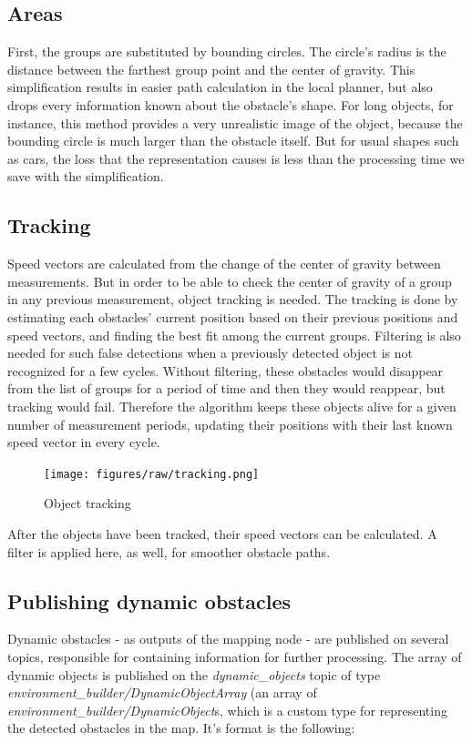 \subsection{Areas}
First, the groups are substituted by bounding circles. The circle's radius is the distance between the farthest group point and the center of gravity. This simplification results in easier path calculation in the local planner, but also drops every information known about the obstacle's shape. For long objects, for instance, this method provides a very unrealistic image of the object, because the bounding circle is much larger than the obstacle itself. But for usual shapes such as cars, the loss that the representation causes is less than the processing time we save with the simplification.

\subsection{Tracking}
\label{chap:tracking}
Speed vectors are calculated from the change of the center of gravity between measurements. But in order to be able to check the center of gravity of a group in any previous measurement, object tracking is needed. The tracking is done by estimating each obstacles' current position based on their previous positions and speed vectors, and finding the best fit among the current groups. Filtering is also needed for such false detections when a previously detected object is not recognized for a few cycles. Without filtering, these obstacles would disappear from the list of groups for a period of time and then they would reappear, but tracking would fail. Therefore the algorithm keeps these objects alive for a given number of measurement periods, updating their positions with their last known speed vector in every cycle.

\begin{figure}[!ht]
    \centering
    \texttt{[image: figures/raw/tracking.png]}
    \caption{Object tracking}
    \label{tracking}
\end{figure}

After the objects have been tracked, their speed vectors can be calculated. A filter is applied here, as well, for smoother obstacle paths.

\subsection{Publishing dynamic obstacles}
\label{chap:publishing_dynamic_obstacles}
Dynamic obstacles - as outputs of the mapping node - are published on several topics, responsible for containing information for further processing. The array of dynamic objects is published on the \textit{dynamic\_objects} topic of type \textit{environment\_builder/DynamicObjectArray} (an array of \textit{environment\_builder/DynamicObject}s, which is a custom type for representing the detected obstacles in the map. It's format is the following:

